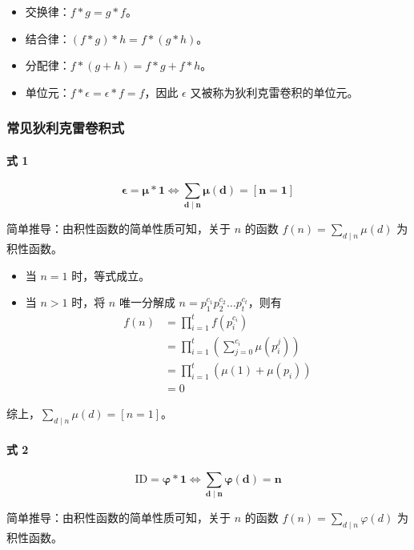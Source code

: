 \begin{itemize}
    \item 交换律：$f \ast g = g \ast f$。
    \item 结合律：$(f \ast g) \ast h = f \ast (g \ast h)$。
    \item 分配律：$f \ast (g + h) = f \ast g + f \ast h$。
    \item 单位元：$f \ast \epsilon = \epsilon \ast f = f$，因此 $\epsilon$ 又被称为狄利克雷卷积的单位元。
\end{itemize}

\subsubsection{常见狄利克雷卷积式}

\paragraph{式 1}
\[
\boldsymbol{\epsilon = \mu \ast 1 \iff \sum_{d \mid n} \mu(d) = [n = 1]}
\]

简单推导：由积性函数的简单性质可知，关于 $n$ 的函数 $f(n) = \sum_{d \mid n} \mu(d)$ 为积性函数。

\begin{itemize}
    \item 当 $n = 1$ 时，等式成立。
    \item 当 $n > 1$ 时，将 $n$ 唯一分解成 $n = p_1^{c_1}p_2^{c_2}\dots p_t^{c_t}$，则有
    \[
    \begin{aligned}
    f(n) & = \prod_{i = 1}^t f(p_i^{c_i}) \\
    & = \prod_{i = 1}^t \left( \sum_{j = 0}^{c_i} \mu(p_i^j) \right) \\
    & = \prod_{i = 1}^t \left( \mu(1) + \mu(p_i) \right) \\
    & = 0
    \end{aligned}
    \]
\end{itemize}

综上，$\sum_{d \mid n} \mu(d) = [n = 1]$。

\paragraph{式 2}
\[
\boldsymbol{\mathrm{ID} = \varphi \ast 1 \iff \sum_{d \mid n} \varphi(d) = n}
\]

简单推导：由积性函数的简单性质可知，关于 $n$ 的函数 $f(n) = \sum_{d \mid n} \varphi(d)$ 为积性函数。

